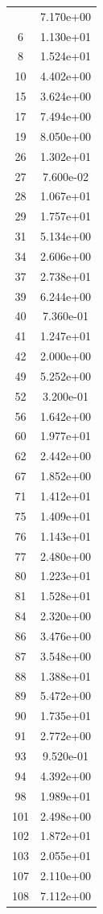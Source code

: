 \documentclass[12pt]{article}
\begin{document}
\begin{longtable}{@{}cc@{}}
\bottomrule
\endlastfoot
4 & 7.170e+00 \\
6 & 1.130e+01 \\
8 & 1.524e+01 \\
10 & 4.402e+00 \\
15 & 3.624e+00 \\
17 & 7.494e+00 \\
19 & 8.050e+00 \\
26 & 1.302e+01 \\
27 & 7.600e-02 \\
28 & 1.067e+01 \\
29 & 1.757e+01 \\
31 & 5.134e+00 \\
34 & 2.606e+00 \\
37 & 2.738e+01 \\
39 & 6.244e+00 \\
40 & 7.360e-01 \\
41 & 1.247e+01 \\
42 & 2.000e+00 \\
49 & 5.252e+00 \\
52 & 3.200e-01 \\
56 & 1.642e+00 \\
60 & 1.977e+01 \\
62 & 2.442e+00 \\
67 & 1.852e+00 \\
71 & 1.412e+01 \\
75 & 1.409e+01 \\
76 & 1.143e+01 \\
77 & 2.480e+00 \\
80 & 1.223e+01 \\
81 & 1.528e+01 \\
84 & 2.320e+00 \\
86 & 3.476e+00 \\
87 & 3.548e+00 \\
88 & 1.388e+01 \\
89 & 5.472e+00 \\
90 & 1.735e+01 \\
91 & 2.772e+00 \\
93 & 9.520e-01 \\
94 & 4.392e+00 \\
98 & 1.989e+01 \\
101 & 2.498e+00 \\
102 & 1.872e+01 \\
103 & 2.055e+01 \\
107 & 2.110e+00 \\
108 & 7.112e+00 \\

\end{longtable}
\end{document}
